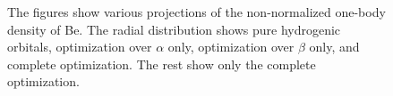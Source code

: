 \documentclass[aps,prc,twocolumn,floatfix]{revtex4}
\begin{document}
\begin{figure}[ht]
\caption[Optional caption for list of figures]{The figures show various projections of the non-normalized one-body density of Be. The radial distribution shows pure hydrogenic orbitals, optimization over $\alpha$ only, optimization over $\beta$ only, and complete optimization. The rest show only the complete optimization.}
\label{fig:7}
\end{figure}
\end{document}
